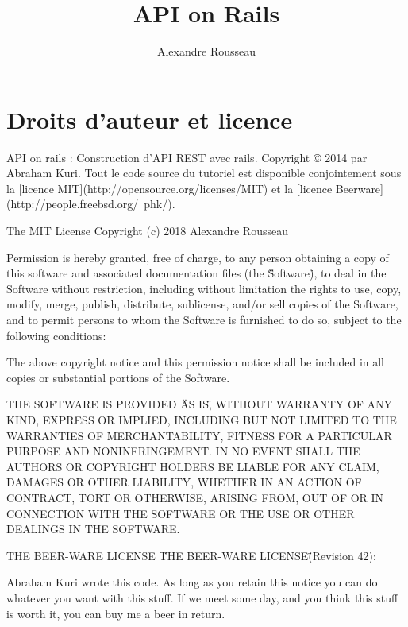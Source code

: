 \documentclass[]{report}
\title{API on Rails}
\author{Alexandre Rousseau}
\begin{document}
\maketitle

\newpage

\tableofcontents
\newpage


\chapter{Droits d'auteur et licence}

  API on rails : Construction d'API REST avec rails. Copyright © 2014 par Abraham Kuri. Tout le code source du tutoriel est disponible conjointement sous la [licence MIT](http://opensource.org/licenses/MIT) et la [licence Beerware](http://people.freebsd.org/~phk/).

  \begin{tcolorbox}{The MIT License}
    Copyright (c) 2018 Alexandre Rousseau

    Permission is hereby granted, free of charge, to any person obtaining a copy of this software and associated documentation files (the \"Software\"), to deal in the Software without restriction, including without limitation the rights to use, copy, modify, merge, publish, distribute, sublicense, and/or sell copies of the Software, and to permit persons to whom the Software is furnished to do so, subject to the following conditions:

    The above copyright notice and this permission notice shall be included in all copies or substantial portions of the Software.

    THE SOFTWARE IS PROVIDED \"AS IS\", WITHOUT WARRANTY OF ANY KIND, EXPRESS OR IMPLIED, INCLUDING BUT NOT LIMITED TO THE WARRANTIES OF MERCHANTABILITY, FITNESS FOR A PARTICULAR PURPOSE AND NONINFRINGEMENT.  IN NO EVENT SHALL THE AUTHORS OR COPYRIGHT HOLDERS BE LIABLE FOR ANY CLAIM, DAMAGES OR OTHER LIABILITY, WHETHER IN AN ACTION OF CONTRACT, TORT OR OTHERWISE, ARISING FROM, OUT OF OR IN CONNECTION WITH THE SOFTWARE OR THE USE OR OTHER DEALINGS IN THE SOFTWARE.
  \end{tcolorbox}

  \begin{tcolorbox}{THE BEER-WARE LICENSE}
   \"THE BEER-WARE LICENSE\" (Revision 42):

   Abraham Kuri wrote this code. As long as you retain this notice you can do whatever you want with this stuff. If we meet some day, and you think this stuff is worth it, you can buy me a beer in return.
  \end{tcolorbox}
\end{document}

